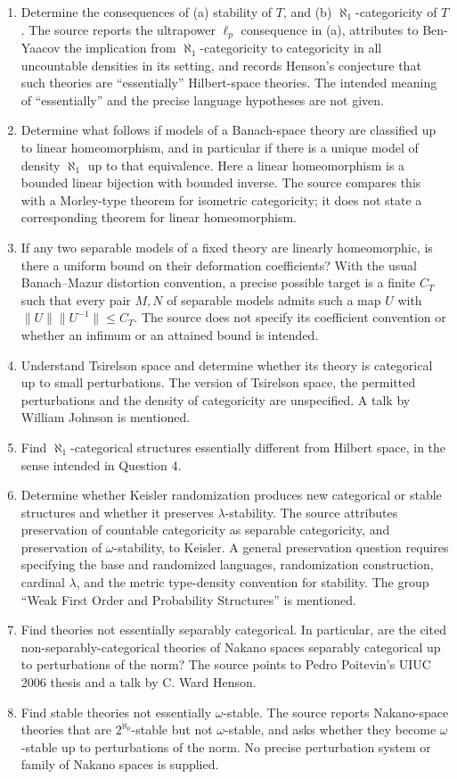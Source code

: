\documentclass[11pt]{article}
\begin{document}
\begin{enumerate}
\item[4.] Determine the consequences of (a) stability of \(T\), and (b) \(\aleph_1\)-categoricity of \(T\). The source reports the ultrapower \(\ell_p\) consequence in (a), attributes to Ben-Yaacov the implication from \(\aleph_1\)-categoricity to categoricity in all uncountable densities in its setting, and records Henson's conjecture that such theories are ``essentially'' Hilbert-space theories. The intended meaning of ``essentially'' and the precise language hypotheses are not given.
\item[5.] Determine what follows if models of a Banach-space theory are classified up to linear homeomorphism, and in particular if there is a unique model of density \(\aleph_1\) up to that equivalence. Here a linear homeomorphism is a bounded linear bijection with bounded inverse. The source compares this with a Morley-type theorem for isometric categoricity; it does not state a corresponding theorem for linear homeomorphism.
\item[6.] If any two separable models of a fixed theory are linearly homeomorphic, is there a uniform bound on their deformation coefficients? With the usual Banach--Mazur distortion convention, a precise possible target is a finite \(C_T\) such that every pair \(M,N\) of separable models admits such a map \(U\) with \(\|U\|\|U^{-1}\|\leq C_T\). The source does not specify its coefficient convention or whether an infimum or an attained bound is intended.
\item[7.] Understand Tsirelson space and determine whether its theory is categorical up to small perturbations. The version of Tsirelson space, the permitted perturbations and the density of categoricity are unspecified. A talk by William Johnson is mentioned.
\item[8.] Find \(\aleph_1\)-categorical structures essentially different from Hilbert space, in the sense intended in Question 4.
\item[9.] Determine whether Keisler randomization produces new categorical or stable structures and whether it preserves \(\lambda\)-stability. The source attributes preservation of countable categoricity as separable categoricity, and preservation of \(\omega\)-stability, to Keisler. A general preservation question requires specifying the base and randomized languages, randomization construction, cardinal \(\lambda\), and the metric type-density convention for stability. The group ``Weak First Order and Probability Structures'' is mentioned.
\item[10.] Find theories not essentially separably categorical. In particular, are the cited non-separably-categorical theories of Nakano spaces separably categorical up to perturbations of the norm? The source points to Pedro Poitevin's UIUC 2006 thesis and a talk by C. Ward Henson.
\item[11.] Find stable theories not essentially \(\omega\)-stable. The source reports Nakano-space theories that are \(2^{\aleph_0}\)-stable but not \(\omega\)-stable, and asks whether they become \(\omega\)-stable up to perturbations of the norm. No precise perturbation system or family of Nakano spaces is supplied.
\end{enumerate}
\end{document}
